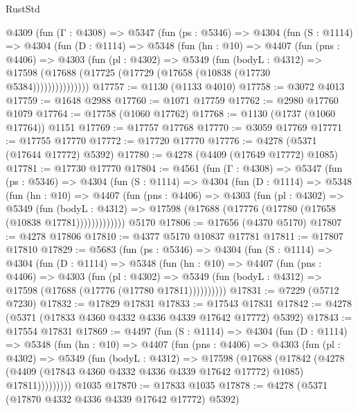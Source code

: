 \begin{lexlean}{RustStd}
\begin{coremodule}
{\begin{coremodule}
{{{{{{{{{{{{{{{{{{{{{{{{{{{{{{{{{{{    @4309
      (fun (Γ : @4308) =>
      @5347
        (fun (ps : @5346) =>
        @4304
          (fun (S : @1114) =>
          @4304
            (fun (D : @1114) =>
            @5348
              (fun (hn : @10) =>
              @4407
                (fun (pns : @4406) =>
                @4303
                  (fun (pl : @4302) =>
                  @5349
                    (fun (bodyL : @4312) =>
                    @17598 (@17688 (@17725 (@17729 (@17658 (@10838 (@17730 @5384)))))))))))))))
@17757 := @1130 (@1133 @4010)
@17758 := @3072 @4013
@17759 := @1648 @2988
@17760 := @1071 @17759
@17762 := @2980 @17760 @1079
@17764 := @17758 (@1060 @17762)
@17768 := @1130 (@1737 (@1060 @17764)) @1151
@17769 := @17757 @17768
@17770 := @3059 @17769
@17771 := @17755 @17770
@17772 := @17720 @17770
@17776 := @4278 (@5371 (@17644 @17772) @5392)
@17780 := @4278 (@4409 (@17649 @17772) @1085)
@17781 := @17730 @17770
@17804 := @4561
    (fun (Γ : @4308) =>
    @5347
      (fun (ps : @5346) =>
      @4304
        (fun (S : @1114) =>
        @4304
          (fun (D : @1114) =>
          @5348
            (fun (hn : @10) =>
            @4407
              (fun (pns : @4406) =>
              @4303
                (fun (pl : @4302) =>
                @5349
                  (fun (bodyL : @4312) =>
                  @17598 (@17688 (@17776 (@17780 (@17658 (@10838 @17781)))))))))))))
    @5170
@17806 := @17656 (@4370 @5170)
@17807 := @4278 @17806
@17810 := @4377 @5170 @10837 @17781
@17811 := @17807 @17810
@17829 := @5683
    (fun (ps : @5346) =>
    @4304
      (fun (S : @1114) =>
      @4304
        (fun (D : @1114) =>
        @5348
          (fun (hn : @10) =>
          @4407
            (fun (pns : @4406) =>
            @4303
              (fun (pl : @4302) =>
              @5349 (fun (bodyL : @4312) => @17598 (@17688 (@17776 (@17780 @17811))))))))))
@17831 := @7229 (@5712 @7230)
@17832 := @17829 @17831
@17833 := @17543 @17831
@17842 := @4278 (@5371 (@17833 @4360 @4332 @4336 @4339 @17642 @17772) @5392)
@17843 := @17554 @17831
@17869 := @4497
    (fun (S : @1114) =>
    @4304
      (fun (D : @1114) =>
      @5348
        (fun (hn : @10) =>
        @4407
          (fun (pns : @4406) =>
          @4303
            (fun (pl : @4302) =>
            @5349
              (fun (bodyL : @4312) =>
              @17598
                (@17688
                  (@17842
                    (@4278
                      (@4409 (@17843 @4360 @4332 @4336 @4339 @17642 @17772) @1085)
                      @17811)))))))))
    @1035
@17870 := @17833 @1035
@17878 := @4278 (@5371 (@17870 @4332 @4336 @4339 @17642 @17772) @5392)
}}}}}}}}}}}}}}}}}}}}}}}}}}}}}}}}}}}
\end{coremodule}}
\end{coremodule}
\end{lexlean}
